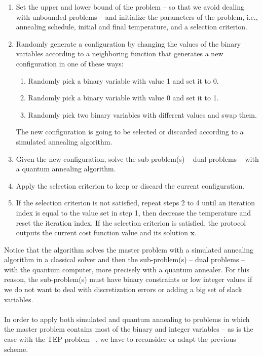 \begin{enumerate}
    \item Set the upper and lower bound of the problem -- so that we avoid dealing with unbounded problems -- and initialize the parameters of the problem, i.e., annealing schedule, initial and final temperature, and a selection criterion.
    \item Randomly generate a configuration by changing the values of the binary variables according to a neighboring function that generates a new configuration in one of these ways:
    \begin{enumerate}
        \item Randomly pick a binary variable with value 1 and set it to 0.
        \item Randomly pick a binary variable with value 0 and set it to 1.
        \item Randomly pick two binary variables with different values and swap them.
    \end{enumerate}
    The new configuration is going to be selected or discarded according to a simulated annealing algorithm.
    \item Given the new configuration, solve the sub-problem(s) -- dual problems -- with a quantum annealing algorithm.
    \item Apply the selection criterion to keep or discard the current configuration.
    \item If the selection criterion is not satisfied, repeat steps 2 to 4 until an iteration index is equal to the value set in step 1, then decrease the temperature and reset the iteration index. If the selection criterion is satisfied, the protocol outputs the current cost function value and its solution $\mathbf{x}$.
\end{enumerate}
Notice that the algorithm solves the master problem with a simulated annealing algorithm in a classical solver and then the sub-problem(s) -- dual problems -- with the quantum computer, more precisely with a quantum annealer. For this reason, the sub-problem(s) must have binary constraints or low integer values if we do not want to deal with discretization errors or adding a big set of slack variables.\\\\
In order to apply both simulated and quantum annealing to problems in which the master problem contains most of the binary and integer variables -- as is the case with the TEP problem --, we have to reconsider or adapt the previous scheme.
